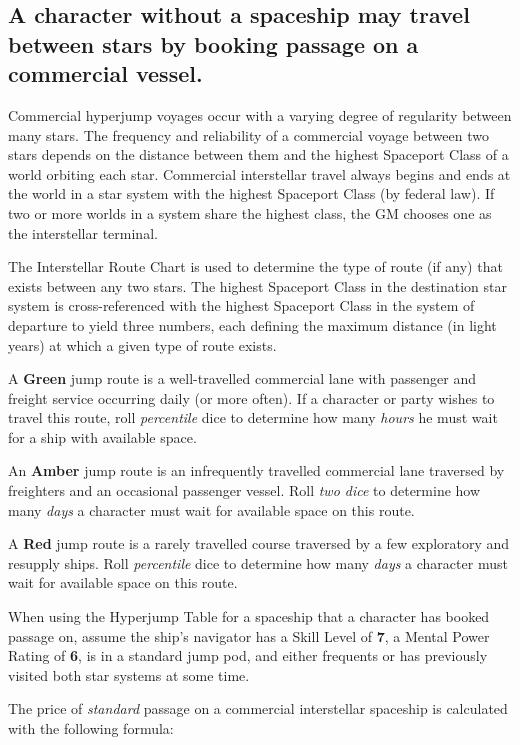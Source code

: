 \subsection[Commercial Interstellar Travel]{A character without a
  spaceship may travel between stars 
  by booking passage on a commercial vessel.}
\label{sec:commercial_interstellar_travel}


Commercial hyperjump voyages occur with a varying degree of regularity
between many stars. The frequency and reliability of a commercial
voyage between two stars depends on the distance between them and the
highest Spaceport Class of a world orbiting each star. Commercial
interstellar travel always begins and ends at the world in a star
system with the highest Spaceport Class (by federal law). If two or
more worlds in a system share the highest class, the GM chooses one as
the interstellar terminal.

The Interstellar Route Chart is used to determine the type of route
(if any) that exists between any two stars. The highest Spaceport
Class in the destination star system is cross-referenced with the
highest Spaceport Class in the system of departure to yield three
numbers, each defining the maximum distance (in light years) at which
a given type of route exists.

A \textbf{Green} jump route is a well-travelled commercial lane with
passenger and freight service occurring daily (or more often). If a
character or party wishes to travel this route, roll \emph{percentile}
dice to determine how many \emph{hours} he must wait for a ship with
available space.

An \textbf{Amber} jump route is an infrequently travelled commercial lane
traversed by freighters and an occasional passenger vessel. Roll \emph{two
dice} to determine how many \emph{days} a character must wait for available
space on this route.

A \textbf{Red} jump route is a rarely travelled course traversed by a
few exploratory and resupply ships. Roll \emph{percentile} dice to
determine how many \emph{days} a character must wait for available
space on this route.

When using the Hyperjump Table for a spaceship that a character has
booked passage on, assume the ship's navigator has a Skill Level of
\textbf{7}, a Mental Power Rating of \textbf{6}, is in a standard jump
pod, and either frequents or has previously visited both star systems
at some time.

The price of \emph{standard} passage on a commercial interstellar
spaceship is calculated with the following formula:

